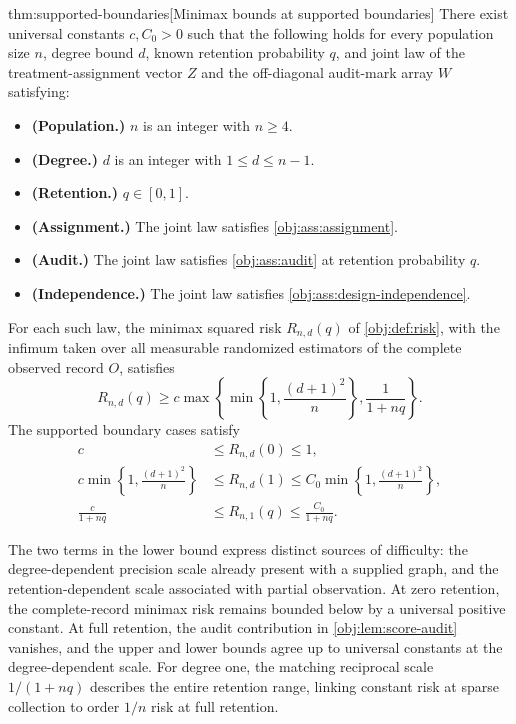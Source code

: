 \begin{theoremv}{thm:supported-boundaries}[Minimax bounds at supported boundaries]
There exist universal constants \(c,C_0>0\) such that the following holds for every population size \(n\), degree bound \(d\), known retention probability \(q\), and joint law of the treatment-assignment vector \(Z\) and the off-diagonal audit-mark array \(W\) satisfying:
\begin{itemize}
\item \textbf{(Population.)} \(n\) is an integer with \(n\ge4\).
\item \textbf{(Degree.)} \(d\) is an integer with \(1\le d\le n-1\).
\item \textbf{(Retention.)} \(q\in[0,1]\).
\item \textbf{(Assignment.)} The joint law satisfies \cref{obj:ass:assignment}.
\item \textbf{(Audit.)} The joint law satisfies \cref{obj:ass:audit} at retention probability \(q\).
\item \textbf{(Independence.)} The joint law satisfies \cref{obj:ass:design-independence}.
\end{itemize}
For each such law, the minimax squared risk \(R_{n,d}(q)\) of \cref{obj:def:risk}, with the infimum taken over all measurable randomized estimators of the complete observed record \(O\), satisfies
\[
R_{n,d}(q)\ge
c\max\left\{
\min\left\{1,\frac{(d+1)^2}{n}\right\},
\frac{1}{1+nq}
\right\}.
\]
The supported boundary cases satisfy
\[
\begin{aligned}
c&\le R_{n,d}(0)\le1,\\
c\min\left\{1,\frac{(d+1)^2}{n}\right\}
&\le R_{n,d}(1)
\le C_0\min\left\{1,\frac{(d+1)^2}{n}\right\},\\
\frac{c}{1+nq}
&\le R_{n,1}(q)\le\frac{C_0}{1+nq}.
\end{aligned}
\]
\end{theoremv}

The two terms in the lower bound express distinct sources of difficulty: the degree-dependent precision scale already present with a supplied graph, and the retention-dependent scale associated with partial observation. At zero retention, the complete-record minimax risk remains bounded below by a universal positive constant. At full retention, the audit contribution in \cref{obj:lem:score-audit} vanishes, and the upper and lower bounds agree up to universal constants at the degree-dependent scale. For degree one, the matching reciprocal scale \(1/(1+nq)\) describes the entire retention range, linking constant risk at sparse collection to order \(1/n\) risk at full retention.
